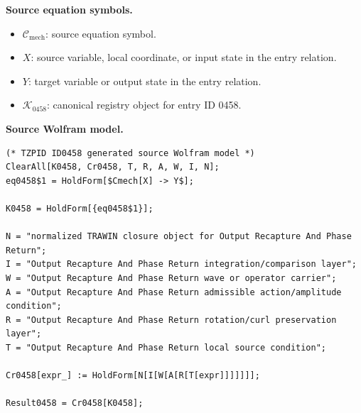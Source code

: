 \begin{minipage}[t]{0.49\linewidth}
\begingroup
\small
\raggedright
\textbf{Source equation symbols.}\par
\begin{itemize}[leftmargin=1.35em,itemsep=1pt,topsep=1pt,parsep=0pt]
    \item $\mathcal{C}_{\mathrm{mech}}$: source equation symbol.
    \item $X$: source variable, local coordinate, or input state in the entry relation.
    \item $Y$: target variable or output state in the entry relation.
    \item $\mathcal{K}_{0458}$: canonical registry object for entry ID 0458.
\end{itemize}
\endgroup
\end{minipage}\hfill
\begin{minipage}[t]{0.47\linewidth}
\begingroup
\scriptsize
\raggedright
\textbf{Source Wolfram model.}\par
\begin{Verbatim}[fontsize=\tiny,breaklines=true,breakanywhere=true]
(* TZPID ID0458 generated source Wolfram model *)
ClearAll[K0458, Cr0458, T, R, A, W, I, N];
eq0458$1 = HoldForm[$Cmech[X] -> Y$];

K0458 = HoldForm[{eq0458$1}];

N = "normalized TRAWIN closure object for Output Recapture And Phase Return";
I = "Output Recapture And Phase Return integration/comparison layer";
W = "Output Recapture And Phase Return wave or operator carrier";
A = "Output Recapture And Phase Return admissible action/amplitude condition";
R = "Output Recapture And Phase Return rotation/curl preservation layer";
T = "Output Recapture And Phase Return local source condition";

Cr0458[expr_] := HoldForm[N[I[W[A[R[T[expr]]]]]]];

Result0458 = Cr0458[K0458];
\end{Verbatim}
\endgroup
\end{minipage}

